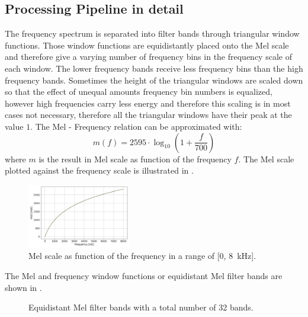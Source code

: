 
\subsection{Processing Pipeline in detail}\label{sec:signal_mfcc_pipeline}
The frequency spectrum is separated into filter bands through triangular window functions.
Those window functions are equidistantly placed onto the Mel scale and therefore give a varying number of frequency bins in the frequency scale of each window.
The lower frequency bands receive less frequency bins than the high frequency bands.
Sometimes the height of the triangular windows are scaled down so that the effect of unequal amounts frequency bin numbers is equalized, however high frequencies carry less energy and therefore this scaling is in most cases not necessary, therefore all the triangular windows have their peak at the value $1$.
The Mel - Frequency relation can be approximated with:
\begin{equation}\label{eq:signal_mfcc_mel}
  m(f) = 2595 \cdot \log_{10} \left(1 + \frac{f}{700} \right) 
\end{equation}
where $m$ is the result in Mel scale as function of the frequency $f$.
The Mel scale plotted against the frequency scale is illustrated in .
\begin{figure}[!ht]
  \centering
  \includegraphics[width=0.40\textwidth]{./3_signal/figs/signal_mfcc_mel_scale}
  \caption{Mel scale as function of the frequency in a range of [0, \SI{8}{\kilo\hertz}].}
  \label{fig:signal_mfcc_mel_scale}
\end{figure}
\FloatBarrier
\noindent
The Mel and frequency window functions or equidistant Mel filter bands are shown in .
\begin{figure}[!ht]
  \centering
  \quad
  \caption{Equidistant Mel filter bands with a total number of 32 bands.}
  \label{fig:filter_bands}
\end{figure}
